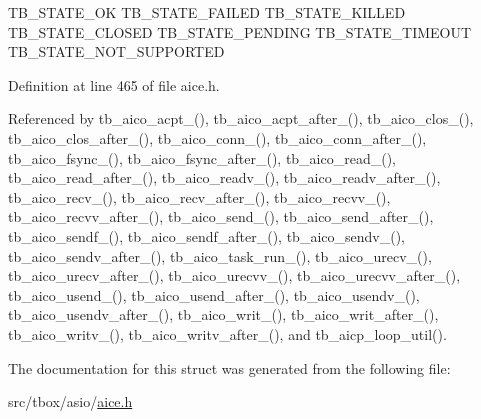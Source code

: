 T\-B\-\_\-\-S\-T\-A\-T\-E\-\_\-\-O\-K T\-B\-\_\-\-S\-T\-A\-T\-E\-\_\-\-F\-A\-I\-L\-E\-D T\-B\-\_\-\-S\-T\-A\-T\-E\-\_\-\-K\-I\-L\-L\-E\-D T\-B\-\_\-\-S\-T\-A\-T\-E\-\_\-\-C\-L\-O\-S\-E\-D T\-B\-\_\-\-S\-T\-A\-T\-E\-\_\-\-P\-E\-N\-D\-I\-N\-G T\-B\-\_\-\-S\-T\-A\-T\-E\-\_\-\-T\-I\-M\-E\-O\-U\-T T\-B\-\_\-\-S\-T\-A\-T\-E\-\_\-\-N\-O\-T\-\_\-\-S\-U\-P\-P\-O\-R\-T\-E\-D 

Definition at line 465 of file aice.\-h.



Referenced by tb\-\_\-aico\-\_\-acpt\-\_\-(), tb\-\_\-aico\-\_\-acpt\-\_\-after\-\_\-(), tb\-\_\-aico\-\_\-clos\-\_\-(), tb\-\_\-aico\-\_\-clos\-\_\-after\-\_\-(), tb\-\_\-aico\-\_\-conn\-\_\-(), tb\-\_\-aico\-\_\-conn\-\_\-after\-\_\-(), tb\-\_\-aico\-\_\-fsync\-\_\-(), tb\-\_\-aico\-\_\-fsync\-\_\-after\-\_\-(), tb\-\_\-aico\-\_\-read\-\_\-(), tb\-\_\-aico\-\_\-read\-\_\-after\-\_\-(), tb\-\_\-aico\-\_\-readv\-\_\-(), tb\-\_\-aico\-\_\-readv\-\_\-after\-\_\-(), tb\-\_\-aico\-\_\-recv\-\_\-(), tb\-\_\-aico\-\_\-recv\-\_\-after\-\_\-(), tb\-\_\-aico\-\_\-recvv\-\_\-(), tb\-\_\-aico\-\_\-recvv\-\_\-after\-\_\-(), tb\-\_\-aico\-\_\-send\-\_\-(), tb\-\_\-aico\-\_\-send\-\_\-after\-\_\-(), tb\-\_\-aico\-\_\-sendf\-\_\-(), tb\-\_\-aico\-\_\-sendf\-\_\-after\-\_\-(), tb\-\_\-aico\-\_\-sendv\-\_\-(), tb\-\_\-aico\-\_\-sendv\-\_\-after\-\_\-(), tb\-\_\-aico\-\_\-task\-\_\-run\-\_\-(), tb\-\_\-aico\-\_\-urecv\-\_\-(), tb\-\_\-aico\-\_\-urecv\-\_\-after\-\_\-(), tb\-\_\-aico\-\_\-urecvv\-\_\-(), tb\-\_\-aico\-\_\-urecvv\-\_\-after\-\_\-(), tb\-\_\-aico\-\_\-usend\-\_\-(), tb\-\_\-aico\-\_\-usend\-\_\-after\-\_\-(), tb\-\_\-aico\-\_\-usendv\-\_\-(), tb\-\_\-aico\-\_\-usendv\-\_\-after\-\_\-(), tb\-\_\-aico\-\_\-writ\-\_\-(), tb\-\_\-aico\-\_\-writ\-\_\-after\-\_\-(), tb\-\_\-aico\-\_\-writv\-\_\-(), tb\-\_\-aico\-\_\-writv\-\_\-after\-\_\-(), and tb\-\_\-aicp\-\_\-loop\-\_\-util().



The documentation for this struct was generated from the following file\-:\begin{DoxyCompactItemize}
\item 
src/tbox/asio/\hyperlink{aice_8h}{aice.\-h}\end{DoxyCompactItemize}
